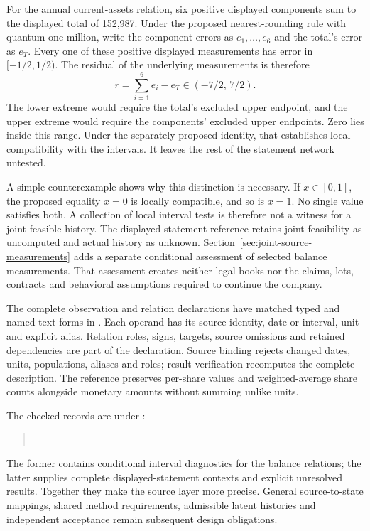 For the annual current-assets relation, six positive displayed components
sum to the displayed total of 152,987. Under the proposed nearest-rounding
rule with quantum one million, write the component errors as
\(e_1,\ldots,e_6\) and the total's error as \(e_T\). Every one of these
positive displayed measurements has error in \([-1/2,1/2)\). The residual
of the underlying measurements is therefore
\begin{equation}
\label{eq:statement-context-residual-range}
  r=\sum_{i=1}^{6}e_i-e_T\in(-7/2,\,7/2).
\end{equation}
The lower extreme would require the total's excluded upper endpoint, and
the upper extreme would require the components' excluded upper endpoints.
Zero lies inside this range. Under the separately proposed identity, that
establishes local compatibility with the intervals. It leaves the rest of
the statement network untested.

A simple counterexample shows why this distinction is necessary. If
\(x\in[0,1]\), the proposed equality \(x=0\) is locally compatible,
and so is \(x=1\). No single value satisfies both. A collection of local
interval tests is therefore not a witness for a joint feasible history.
The displayed-statement reference retains joint feasibility as uncomputed
and actual history as unknown. Section~\ref{sec:joint-source-measurements}
adds a separate conditional assessment of selected balance measurements.
That assessment creates neither legal books nor the claims, lots, contracts
and behavioral assumptions required to continue the company.

The complete observation and relation declarations have matched typed and
named-text forms in . Each operand
has its source identity, date or interval, unit and explicit alias. Relation
roles, signs, targets, source omissions and retained dependencies are part of
the declaration. Source binding rejects changed dates, units, populations,
aliases and roles; result verification recomputes the complete description.
The reference preserves per-share values and weighted-average share counts
alongside monetary amounts without summing unlike units.

The checked records are under :
\begin{quote}\small
{}\\
\end{quote}
The former contains conditional interval diagnostics for the balance
relations; the latter supplies complete displayed-statement contexts and
explicit unresolved results. Together they make the source layer more
precise. General source-to-state mappings, shared method requirements,
admissible latent histories and independent acceptance remain subsequent
design obligations.
